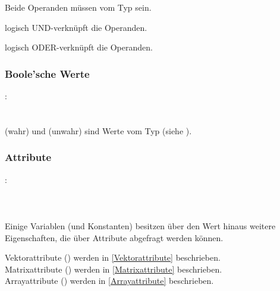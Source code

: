 
Beide Operanden müssen vom Typ  sein.

\op{\&\&} logisch UND-verknüpft die Operanden.

\op{||} logisch ODER-verknüpft die Operanden.


\subsubsection{Boole'sche Werte}\label{Boole'sche Werte}
:\label{asdr_konst_bool}\\
\hspace*{1cm}\glq{}\grq \\
\hspace*{1cm}\glq{}\grq \\

 (wahr) und  (unwahr) sind Werte vom Typ  (siehe ).


\subsubsection{Attribute}\label{Attribute}
:\label{attribut}\\
\hspace*{1cm} \\
\hspace*{1cm} \\
\hspace*{1cm} \\


Einige Variablen (und Konstanten) besitzen über den Wert hinaus weitere Eigenschaften, die
über Attribute abgefragt werden können.

Vektorattribute () werden in \ref{Vektorattribute} beschrieben.\\
Matrixattribute () werden in \ref{Matrixattribute} beschrieben.\\
Arrayattribute () werden in \ref{Arrayattribute} beschrieben.\\


